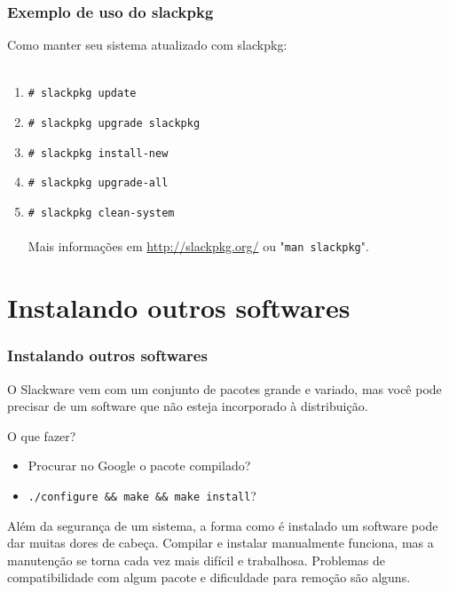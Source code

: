 \documentclass[aspectratio=169]{beamer}
\begin{document}
\begin{frame}
	\frametitle{Exemplo de uso do slackpkg}
	Como manter seu sistema atualizado com slackpkg:\\
	~\\
	\begin{enumerate}
		\item \texttt{\# slackpkg update}
		\item \texttt{\# slackpkg upgrade slackpkg}
		\item \texttt{\# slackpkg install-new}
		\item \texttt{\# slackpkg upgrade-all}
		\item \texttt{\# slackpkg clean-system}
	~\\
	~\\
	Mais informações em \url{http://slackpkg.org/} ou "\texttt{man slackpkg}".
	\end{enumerate}
\end{frame}

\section{Instalando outros softwares}
\begin{frame}
	\frametitle{Instalando outros softwares}
	O Slackware vem com um conjunto de pacotes grande e variado, mas você pode
	precisar de um software que não esteja incorporado à distribuição.
	~\\
	\begin{block}{O que fazer?}
		\begin{itemize}
			\item Procurar no Google o pacote compilado?
			\item \texttt{./configure \&\& make \&\& make install}?
		\end{itemize}
	\end{block}
	Além da segurança de um sistema, a forma como é instalado um software pode dar
	muitas dores de cabeça. Compilar e instalar manualmente funciona, mas a manutenção
	se torna cada vez mais difícil e trabalhosa. Problemas de compatibilidade com
	algum pacote e dificuldade para remoção são alguns.
\end{frame}
\end{document}

